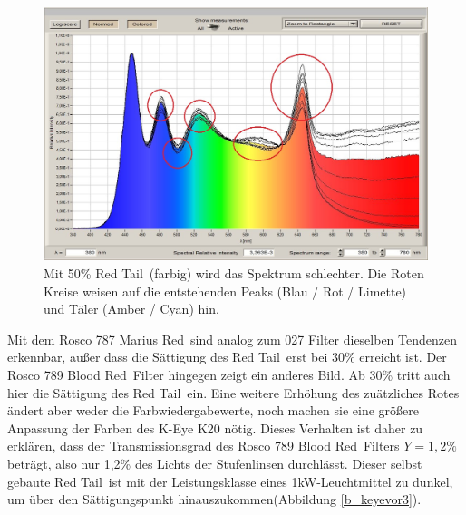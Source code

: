 \begin{figure}[H]     %
\centering
\includegraphics[width=1.0\textwidth]{bilder/keyevor2} 
\caption {Mit 50\% \glqq Red Tail\grqq\ (farbig) wird das Spektrum schlechter. Die Roten Kreise weisen auf die entstehenden Peaks (Blau / Rot / Limette) und Täler (Amber / Cyan) hin.}\label{b_keyevor2}
\end{figure}


Mit dem Rosco 787 \glqq Marius Red\grqq\ sind analog zum 027 Filter dieselben Tendenzen erkennbar, außer dass die Sättigung des \glqq Red Tail\grqq\ erst bei 30\% erreicht ist.
Der Rosco 789 \glqq Blood Red\grqq\ Filter hingegen zeigt ein anderes Bild. Ab 30\% tritt auch hier die Sättigung des \glqq Red Tail\grqq\ ein. Eine weitere Erhöhung des zuätzliches Rotes ändert aber weder die Farbwiedergabewerte, noch machen sie eine größere Anpassung der Farben des K-Eye K20 nötig. Dieses Verhalten ist daher zu erklären, dass der Transmissionsgrad des Rosco 789 \glqq Blood Red\grqq\ Filters  $Y=1,2\%$ beträgt, also nur 1,2\% des Lichts der Stufenlinsen durchlässt. Dieser selbst gebaute \glqq Red Tail\grqq\ ist mit der Leistungsklasse eines 1kW-Leuchtmittel zu dunkel, um über den Sättigungspunkt hinauszukommen(Abbildung \ref{b_keyevor3}).  

